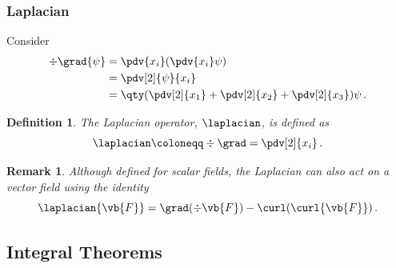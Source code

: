 \documentclass{article}
\theoremstyle{plain}\theoremheaderfont{\normalfont\itshape}\theorembodyfont{\rmfamily}\theoremseparator{.}\newtheorem*{rem}{Remark}\newtheorem*{ex}{Example}\newtheorem*{proof}{Proof}\newtheorem*{altp}{Alternative proof}
\theoremstyle{plain}\theoremheaderfont{\normalfont\bfseries}\theorembodyfont{\rmfamily}\theoremseparator{.}\newtheorem{thm}{Theorem}[section]\newtheorem{lem}[thm]{Lemma}\newtheorem{prop}[thm]{Proposition}\newtheorem*{cor}{Corollary}\newtheorem{defn}[thm]{Definition}\newtheorem{clm}[thm]{Claim}\newtheorem{clminproof}{Claim}
\theoremstyle{break}\theoremheaderfont{\normalfont\itshape}\theorembodyfont{\rmfamily}\theoremseparator{.\medskip}\newtheorem*{proofskip}{Proof}\newtheorem*{exs}{Examples}\newtheorem*{rems}{Remarks}
\theoremstyle{break}\theoremheaderfont{\normalfont\bfseries}\theorembodyfont{\rmfamily}\theoremseparator{.\medskip}\newtheorem{lemskip}[thm]{Lemma}\newtheorem{defnskip}[thm]{Definition}\newtheorem{propskip}[thm]{Proposition}\newtheorem{thmskip}[thm]{Theorem}
\numberwithin{equation}{section}
\begin{document}
	\subsubsection{Laplacian}
	Consider
	\begin{align*}
		\div{\grad{\psi}}&=\pdv{x_i}(\pdv{x_i}\psi)\\
		&=\pdv[2]{\psi}{x_i}\\
		&=\qty(\pdv[2]{x_1}+\pdv[2]{x_2}+\pdv[2]{x_3})\psi\,.	
	\end{align*}
	
	\begin{defn}
		The \textit{Laplacian operator}, \(\laplacian\), is defined as
		\[\laplacian\coloneqq\div\grad=\pdv[2]{x_i}\,.\]
	\end{defn}
	
	\begin{rem}
		Although defined for scalar fields, the Laplacian can also act on a vector field using the identity
		\[\laplacian{\vb{F}}=\grad(\div\vb{F})-\curl(\curl{\vb{F}})\,.\]
	\end{rem}
	
	\subsection{Integral Theorems}
\end{document}
